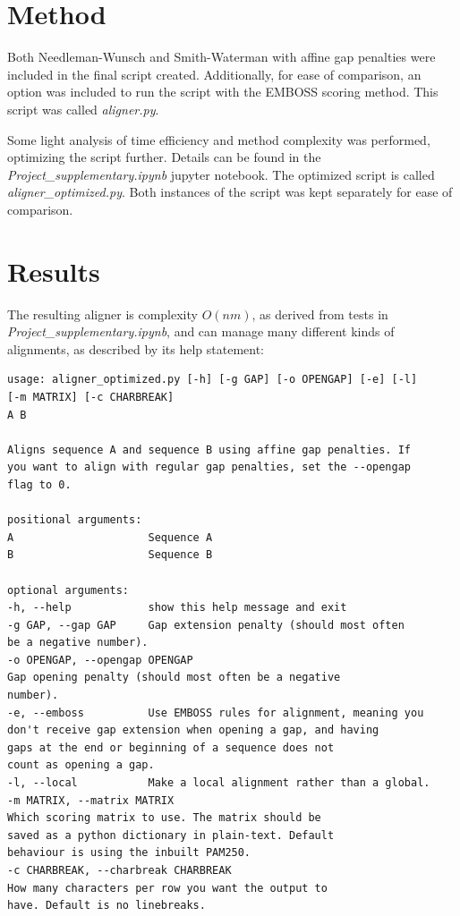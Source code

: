\documentclass{article}
\begin{document}
\section*{Method}
Both Needleman-Wunsch and Smith-Waterman with affine gap penalties were included in the final script created. Additionally, for ease of comparison, an option was included to run the script with the EMBOSS scoring method. This script was called \textit{aligner.py}.

Some light analysis of time efficiency and method complexity was performed, optimizing the script further. Details can be found in the \textit{Project\_supplementary.ipynb} jupyter notebook. The optimized script is called \textit{aligner\_optimized.py}. Both instances of the script was kept separately for ease of comparison.

\section*{Results}
The resulting aligner is complexity $O(nm)$, as derived from tests in \textit{Project\_supplementary.ipynb}, and can manage many different kinds of alignments, as described by its help statement:
\begin{verbatim}
usage: aligner_optimized.py [-h] [-g GAP] [-o OPENGAP] [-e] [-l]
[-m MATRIX] [-c CHARBREAK]
A B

Aligns sequence A and sequence B using affine gap penalties. If
you want to align with regular gap penalties, set the --opengap
flag to 0.

positional arguments:
A                     Sequence A
B                     Sequence B

optional arguments:
-h, --help            show this help message and exit
-g GAP, --gap GAP     Gap extension penalty (should most often
be a negative number).
-o OPENGAP, --opengap OPENGAP
Gap opening penalty (should most often be a negative
number).
-e, --emboss          Use EMBOSS rules for alignment, meaning you
don't receive gap extension when opening a gap, and having
gaps at the end or beginning of a sequence does not
count as opening a gap.
-l, --local           Make a local alignment rather than a global.
-m MATRIX, --matrix MATRIX
Which scoring matrix to use. The matrix should be
saved as a python dictionary in plain-text. Default
behaviour is using the inbuilt PAM250.
-c CHARBREAK, --charbreak CHARBREAK
How many characters per row you want the output to
have. Default is no linebreaks.
\end{verbatim}
\end{document}
